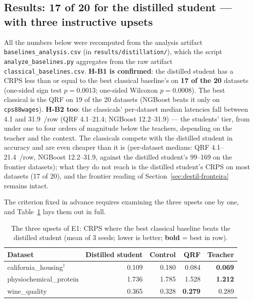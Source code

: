 \subsection{Results: 17 of 20 for the distilled student --- with three
instructive upsets}
\label{sec:destil-e1-resultados}

\begin{sloppypar}
All the numbers below were recomputed from the analysis artifact
\texttt{baselines\_\allowbreak analysis.\allowbreak csv} (in
\texttt{results/\allowbreak distillation/}), which the script
\texttt{analyze\_\allowbreak baselines.\allowbreak py} aggregates
from the raw artifact
\texttt{classical\_\allowbreak baselines.\allowbreak csv}.
\textbf{H-B1 is confirmed}: the distilled student has a CRPS less
than or equal to the best classical baseline's on \textbf{17 of the
20} datasets (one-sided sign test $p = 0.0013$; one-sided Wilcoxon
$p = 0.0008$). The best classical is the QRF on 19 of the 20
datasets (NGBoost beats it only on \texttt{cps88wages}).
\textbf{H-B2 too}: the classicals' per-dataset median latencies fall
between 4.1 and 31.9~\us/row (QRF 4.1--21.4; NGBoost 12.2--31.9)
--- the students' tier, from under one to four orders of magnitude
below the teachers, depending on the teacher and the context. The
classicals
compete with the distilled student in accuracy and are even cheaper
than it is (per-dataset medians: QRF 4.1--21.4~\us/row, NGBoost
12.2--31.9, against the distilled student's
99--169 on the frontier datasets); what they do not reach is the
distilled student's
CRPS on most datasets (17 of 20), and
the frontier reading of Section~\ref{sec:destil-fronteira} remains
intact.
\end{sloppypar}

The criterion fixed in advance requires examining the three upsets one by one,
and Table~\ref{tab:destil-e1-reveses} lays them out in full.

\begin{table}[htb]
\centering
\caption[The three upsets of E1]{The three upsets of E1: CRPS where
the best classical baseline beats the distilled student (mean of 3
seeds; lower is better; \textbf{bold} = best in row).}
\label{tab:destil-e1-reveses}
\small
\begin{tabular}{lrrrr}
\toprule
Dataset & Distilled student & Control & QRF & Teacher \\
\midrule
california\_housing$^\dagger$ & 0.109 & 0.180 & 0.084 & \textbf{0.069} \\
physiochemical\_protein & 1.736 & 1.785 & 1.528 & \textbf{1.212} \\
wine\_quality           & 0.365 & 0.328 & \textbf{0.279} & 0.289 \\
\bottomrule
\end{tabular}
\end{table}

